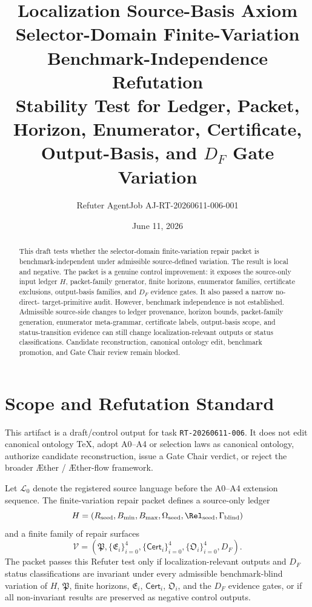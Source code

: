 \documentclass[11pt]{article}
\title{\textbf{Localization Source-Basis Axiom Selector-Domain Finite-Variation Benchmark-Independence Refutation}\\[0.35em]
\large Stability Test for Ledger, Packet, Horizon, Enumerator, Certificate, Output-Basis, and \(D_F\) Gate Variation}
\author{Refuter AgentJob AJ-RT-20260611-006-001}
\date{June 11, 2026}
\newcommand{\Aether}{\AE{}ther}
\newcommand{\Aflow}{\AE{}ther-flow}
\newcommand{\TheoryProgram}{\Aether{} / \Aflow{} framework}
\newcommand{\Lang}{\mathcal{L}_{0}}
\newcommand{\PackFam}{\mathfrak{P}}
\newcommand{\EnumFam}{\mathfrak{E}}
\newcommand{\Cert}{\mathsf{Cert}}
\newcommand{\OutFam}{\mathfrak{O}}
\begin{document}
\maketitle

\begin{abstract}
This draft tests whether the selector-domain finite-variation repair packet
is benchmark-independent under admissible source-defined variation. The
result is local and negative. The packet is a genuine control improvement:
it exposes the source-only input ledger \(H\), packet-family generator,
finite horizons, enumerator families, certificate exclusions, output-basis
families, and \(D_F\) evidence gates. It also passed a narrow no-direct-
target-primitive audit. However, benchmark independence is not established.
Admissible source-side changes to ledger provenance, horizon bounds,
packet-family generation, enumerator meta-grammar, certificate labels,
output-basis scope, and status-transition evidence can still change
localization-relevant outputs or status classifications. Candidate
reconstruction, canonical ontology edit, benchmark promotion, and Gate Chair
review remain blocked.
\end{abstract}

\section{Scope and Refutation Standard}

This artifact is a draft/control output for task \texttt{RT-20260611-006}.
It does not edit canonical ontology TeX, adopt A0--A4 or selection laws as
canonical ontology, authorize candidate reconstruction, issue a Gate Chair
verdict, or reject the broader \TheoryProgram{}.

Let \(\Lang\) denote the registered source language before the A0--A4
extension sequence. The finite-variation repair packet defines a source-only
ledger
\[
H=(R_{\mathrm{seed}},B_{\min},B_{\max},\Omega_{\mathrm{seed}},
\Rel_{\mathrm{seed}},\Gamma_{\mathrm{blind}})
\]
and a finite family of repair surfaces
\[
\mathcal{V}=(\PackFam,\{\EnumFam_i\}_{i=0}^{4},
\{\Cert_i\}_{i=0}^{4},\{\OutFam_i\}_{i=0}^{4},D_F).
\]
The packet passes this Refuter test only if localization-relevant outputs
and \(D_F\) status classifications are invariant under every admissible
benchmark-blind variation of \(H\), \(\PackFam\), finite horizons,
\(\EnumFam_i\), \(\Cert_i\), \(\OutFam_i\), and the \(D_F\) evidence gates,
or if all non-invariant results are preserved as negative control outputs.
\end{document}

